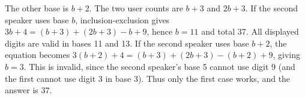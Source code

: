 The other base is $b+2$. The two user counts are $b+3$ and $2b+3$. If the second speaker uses base $b$, inclusion-exclusion gives $3b+4=(b+3)+(2b+3)-b+9$, hence $b=11$ and total 37. All displayed digits are valid in bases 11 and 13. If the second speaker uses base $b+2$, the equation becomes $3(b+2)+4=(b+3)+(2b+3)-(b+2)+9$, giving $b=3$. This is invalid, since the second speaker's base 5 cannot use digit 9 (and the first cannot use digit 3 in base 3). Thus only the first case works, and the answer is $\boxed{37}$.
